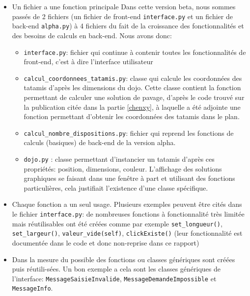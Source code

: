 \begin{itemize}
    \item Un fichier a une fonction principale
          Dans cette version beta, nous sommes passés de 2 fichiers (un fichier de front-end \texttt{interface.py} et un fichier de back-end \texttt{alpha.py}) à
          4 fichiers du fait de la croissance des fonctionnalités et des besoins de calculs en back-end. Nous avons donc:
          \begin{itemize}
              \item \texttt{interface.py}: fichier qui continue à contenir toutes les fonctionnalités de front-end, c’est à dire l’interface utilisateur
              \item \texttt{calcul\_coordonnees\_tatamis.py}: classe qui calcule les coordonnées des tatamis d'après les dimensions du dojo.
                    Cette classe contient la fonction permettant de calculer une solution de pavage, d’après le code trouvé sur la publication
                    citée dans la partie \ref{chenxy}, à laquelle a été adjointe une fonction permettant d’obtenir les coordonnées des tatamis dans le plan.
              \item \texttt{calcul\_nombre\_dispositions.py}: fichier qui reprend les fonctions de calculs (basiques) de back-end de la version alpha.
              \item \texttt{dojo.py} : classe permettant d'instancier un tatamis d'après ces propriétés: position, dimensions, couleur. L’affichage
                    des solutions graphiques se faisant dans une fenêtre à part et utilisant des fonctions particulières, cela justifiait
                    l’existence d’une classe spécifique.
          \end{itemize}
    \item Chaque fonction a un seul usage. Plusieurs exemples peuvent être cités dans le fichier \texttt{interface.py}: de nombreuses
          fonctions à fonctionnalité très limitée mais réutilisables ont été créées comme par exemple \texttt{set\_longueur()}, \texttt{set\_largeur()},
          \texttt{valeur\_vide(self)}, \texttt{clickExiste()} (leur fonctionnalité est documentée dans le code et donc non-reprise dans ce rapport)

    \item Dans la mesure du possible des fonctions ou classes génériques sont créées puis réutili-sées.
          Un bon exemple a cela sont les classes génériques de l’interface: \texttt{MessageSaisieInvalide}, \texttt{MessageDemandeImpossible} et \texttt{MessageInfo}.
\end{itemize}



